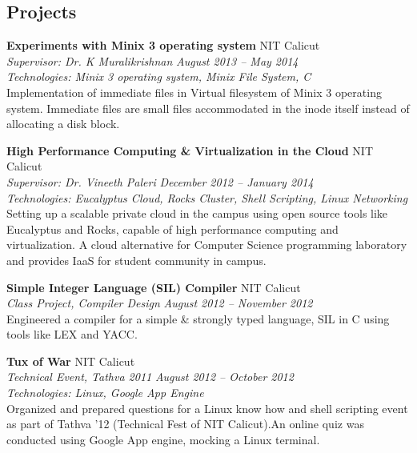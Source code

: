 \documentclass[margin,line]{resume}
\begin{document}
\begin{resume}
    \section{\mysidestyle Projects}

   
	
	
    \textbf{Experiments with Minix 3 operating system } 				\hfill NIT Calicut \\
      \textit{Supervisor: Dr. K Muralikrishnan } 			\hfill \textit{August 2013 -- May 2014}\\
      \textit{Technologies: Minix 3 operating system, Minix File System, C }\\
    Implementation of immediate files in Virtual filesystem of Minix 3 operating system. Immediate files are small files accommodated in the inode itself instead of allocating a disk block. 

    \textbf{High Performance Computing \& Virtualization in the Cloud} 				\hfill NIT Calicut \\
      \textit{Supervisor: Dr. Vineeth Paleri } 			\hfill \textit{December 2012 -- January 2014}\\
      \textit{Technologies: Eucalyptus Cloud, Rocks Cluster, Shell Scripting, Linux Networking}\\
    Setting up a scalable private cloud in the campus using open source tools like Eucalyptus and Rocks,
capable of high performance computing and virtualization.  A cloud alternative for Computer Science
programming laboratory and provides IaaS for student community in campus.
	\vspace{2mm}%

	   \textbf{Simple Integer Language (SIL) Compiler} 						\hfill NIT Calicut \\
    \textit{Class Project, Compiler Design} 							\hfill \textit{August 2012 -- November 2012}\\
	Engineered a compiler for a simple \& strongly typed language, SIL in C using tools like LEX and YACC.
   \vspace{2mm}%
   
   
   
    
    \textbf{Tux of War} 								\hfill NIT Calicut \\
    \textit{Technical Event, Tathva 2011} 							\hfill \textit{August 2012 -- October 2012}\\
    \textit{Technologies: Linux, Google App Engine} \\
   Organized and prepared questions for a Linux know how and shell scripting event as part of Tathva ’12 (Technical Fest of NIT      Calicut).An online quiz was conducted using Google App engine, mocking a Linux terminal.
      \vspace{2mm}%
      

\end{resume}
\end{document}

